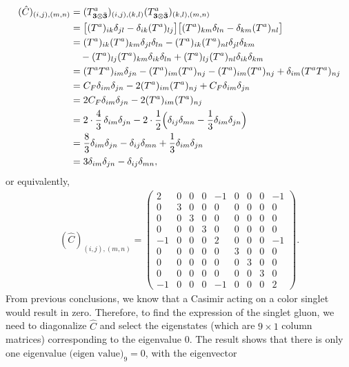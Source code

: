 \documentclass[12pt]{article}
\begin{document}
	\begin{align*}
		(\hat{C})_{(i, j), (m, n)} &= (T^a_{\mathbf{3} \otimes \bar{\mathbf{3}}})_{(i, j), (k, l)}(T^a_{\mathbf{3} \otimes \bar{\mathbf{3}}})_{(k, l), (m, n)}\\\
		&= \bigl[(T^a)_{ik} \delta_{jl} - \delta_{ik}(T^a)_{lj}\bigr]
		\bigl[(T^a)_{km} \delta_{ln} - \delta_{km}(T^a)_{nl}\bigr] \\
		&= (T^a)_{ik}(T^a)_{km} \delta_{jl}\delta_{ln}
		- (T^a)_{ik}(T^a)_{nl} \delta_{jl}\delta_{km} \\
		&\quad - (T^a)_{lj}(T^a)_{km} \delta_{ik}\delta_{ln}
		+ (T^a)_{lj}(T^a)_{nl} \delta_{ik}\delta_{km} \\
		&= (T^a T^a)_{im} \delta_{jn} - (T^a)_{im}(T^a)_{nj}
		- (T^a)_{im}(T^a)_{nj} + \delta_{im}(T^a T^a)_{nj} \\
		&= C_F \delta_{im}\delta_{jn} - 2(T^a)_{im}(T^a)_{nj} + C_F \delta_{im}\delta_{jn} \\
		&= 2C_F \delta_{im}\delta_{jn} - 2(T^a)_{im}(T^a)_{nj} \\
		&= 2\cdot\frac{4}{3}\,\delta_{im}\delta_{jn}
		- 2\cdot\frac12\Bigl( \delta_{ij}\delta_{mn} - \frac13\delta_{im}\delta_{jn} \Bigr) \\
		&= \frac{8}{3}\delta_{im}\delta_{jn} - \delta_{ij}\delta_{mn} + \frac13\delta_{im}\delta_{jn} \\
		&= 3\delta_{im}\delta_{jn} - \delta_{ij}\delta_{mn},
	\end{align*}
	or equivalently,
	\begin{align}
		(\hat{C})_{(i, j), (m, n)} = \begin{pmatrix}
			2&0&0&0&-1&0&0&0&-1\\
			0&3&0&0&0&0&0&0&0\\
			0&0&3&0&0&0&0&0&0\\
			0&0&0&3&0&0&0&0&0\\
			-1&0&0&0&2&0&0&0&-1\\
			0&0&0&0&0&3&0&0&0\\
			0&0&0&0&0&0&3&0&0\\
			0&0&0&0&0&0&0&3&0\\
			-1&0&0&0&-1&0&0&0&2
		\end{pmatrix}.
	\end{align}
	From previous conclusions, we know that a Casimir acting on a color singlet would result in zero. Therefore, to find the expression of the singlet gluon, we need to diagonalize $\hat{C}$ and select the eigenstates (which are $9 \times 1$ column matrices) corresponding to the eigenvalue $0$. The result shows that there is only one eigenvalue $\text{(eigen value)}_9 = 0$, with the eigenvector
\end{document}
